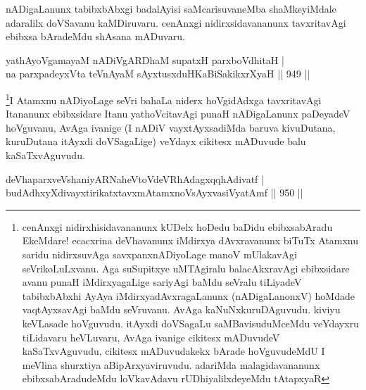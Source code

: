 \begin{artha}
nADigaLanunx tabibxbAbxgi badalAyisi saMcarisuvaneMba shaMkeyiMdale adaralilx doVSavanu kaMDiruvaru. cenAnxgi nidirxsidavananunx tavxritavAgi ebibxsa bAradeMdu shAsana mADuvaru.
\end{artha}


\begin{shl}
yathAyoVgamayaM nADiVgARDhaM supatxH parxboVdhitaH | \\
na parxpadeyxVta teVnAyaM sAyxtusxduHKaBiSakikxrXyaH \hfill||  949 ||   
\end{shl}

\begin{artha}
\footnote{cenAnxgi nidirxhisidavananunx kUDelx hoDedu baDidu ebibxsabAradu EkeMdare! ecacxrina deVhavanunx iMdirxya dAvxravanunx biTuTx Atamxnu saridu nidirxsuvAga savxpanxnADiyoLage manoV mUlakavAgi seVrikoLuLxvanu. Aga suSupitxye uMTAgiralu balacAkxravAgi ebibxsidare avanu punaH iMdirxyagaLige sariyAgi baMdu seVralu tiLiyadeV tabibxbAbxhi AyAya iMdirxyadAvxragaLanunx (nADigaLanonxV) hoMdade vaqtAyxsavAgi baMdu seVruvanu. AvAga kaNuNxkuruDAguvudu. kiviyu keVLasade hoVguvudu. itAyxdi doVSagaLu saMBavisuduMceMdu veYdayxru tiLidavaru heVLuvaru, AvAga ivanige cikitesx mADuvudeV kaSaTxvAguvudu, cikitesx mADuvudakekx bArade hoVguvudeMdU I meVlina shurxtiya aBipArxyaviruvudu. adariMda malagidavananunx ebibxsabAradudeMdu loVkavAdavu rUDhiyalilxdeyeMdu tAtapxyaR}I Atamxnu nADiyoLage seVri bahaLa niderx hoVgidAdxga tavxritavAgi Itananunx ebibxsidare Itanu yathoVcitavAgi punaH nADigaLanunx paDeyadeV hoVguvanu, AvAga ivanige (I nADiV vayxtAyxsadiMda baruva kivuDutana, kuruDutana itAyxdi doVSagaLige) veYdayx cikitesx mADuvude balu kaSaTxvAguvudu.
\end{artha}


\begin{shl}
deVhaparxveVshaniyARNaheVtoVdeVRhAda\footnotemark[1]gxqqhAdivatf | \\
budAdhxyXdivayxtirikatxtavxmAtamxnoV\s sAyxvasiVyatAmf \hfill||  950 ||  
\end{shl}

